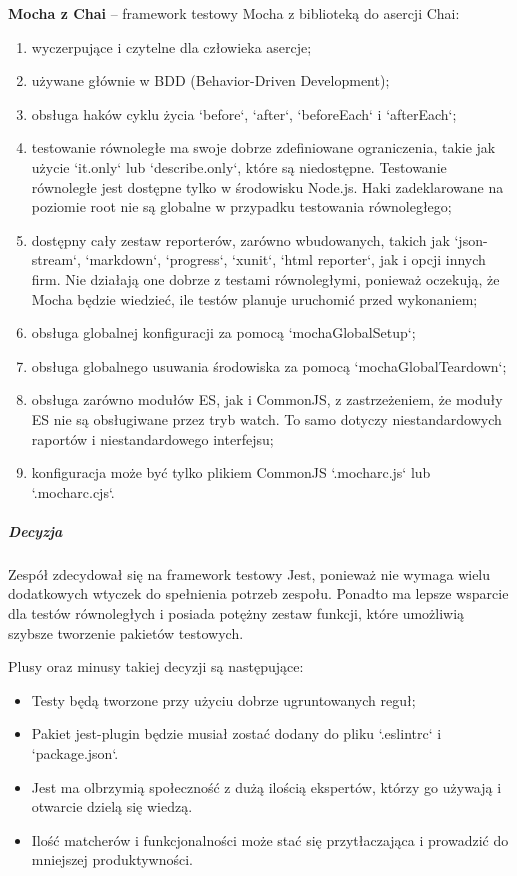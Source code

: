 \documentclass[12pt, a4paper, twoside, openany]{book}
\begin{document}
\textbf{Mocha z Chai} -- framework testowy Mocha z biblioteką do asercji Chai:
\begin{enumerate}[label=--]
    \item wyczerpujące i czytelne dla człowieka asercje;
    \item używane głównie w BDD (Behavior-Driven Development);
    \item obsługa haków cyklu życia `before`, `after`, `beforeEach` i `afterEach`;
    \item testowanie równoległe ma swoje dobrze zdefiniowane ograniczenia, takie jak użycie `it.only` lub `describe.only`, które są niedostępne. Testowanie równoległe jest dostępne tylko w środowisku Node.js. Haki zadeklarowane na poziomie root nie są globalne w przypadku testowania równoległego;
    \item dostępny cały zestaw reporterów, zarówno wbudowanych, takich jak `json-stream`, `markdown`, `progress`, `xunit`, `html reporter`, jak i opcji innych firm. Nie działają one dobrze z testami równoległymi, ponieważ oczekują, że Mocha będzie wiedzieć, ile testów planuje uruchomić przed wykonaniem;
    \item obsługa globalnej konfiguracji za pomocą `mochaGlobalSetup`;
    \item obsługa globalnego usuwania środowiska za pomocą `mochaGlobalTeardown`;
    \item obsługa zarówno modułów ES, jak i CommonJS, z zastrzeżeniem, że moduły ES nie są obsługiwane przez tryb watch. To samo dotyczy niestandardowych raportów i niestandardowego interfejsu;
    \item konfiguracja może być tylko plikiem CommonJS `.mocharc.js` lub `.mocharc.cjs`.
\end{enumerate}

\subparagraph{Decyzja\\}

Zespół zdecydował się na framework testowy Jest, ponieważ nie wymaga wielu dodatkowych wtyczek do spełnienia potrzeb zespołu. Ponadto ma lepsze wsparcie dla testów równoległych i posiada potężny zestaw funkcji, które umożliwią szybsze tworzenie pakietów testowych.

Plusy oraz minusy takiej decyzji są następujące:
\begin{itemize}
    \item Testy będą tworzone przy użyciu dobrze ugruntowanych reguł;
    \item Pakiet jest-plugin będzie musiał zostać dodany do pliku `.eslintrc` i `package.json`.
    \item Jest ma olbrzymią społeczność z dużą ilością ekspertów, którzy go używają i otwarcie dzielą się wiedzą.
    \item Ilość matcherów i funkcjonalności może stać się przytłaczająca i prowadzić do mniejszej produktywności.
\end{itemize}
\end{document}
